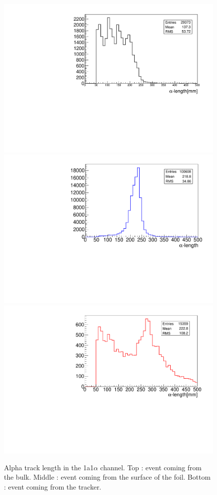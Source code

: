 \documentclass[main.tex]{subfiles}
\begin{document}
\begin{figure}[h!]
\begin{center}
\includegraphics[scale=0.39]{pictures/Chap5/alpha_length_bulk_1M.pdf}
\includegraphics[scale=0.39]{pictures/Chap5/alpha_length_surface_1M.pdf}
\includegraphics[scale=0.39]{pictures/Chap5/alpha_length_tracker_1M.pdf}
\caption{Alpha track length in the 1a1$\alpha$ channel. Top : event coming from the bulk. Middle : event coming from the surface of the foil. Bottom : event coming from the tracker.}
\label{alpha_length_source_selection}
\end{center}
\end{figure}
\end{document}
